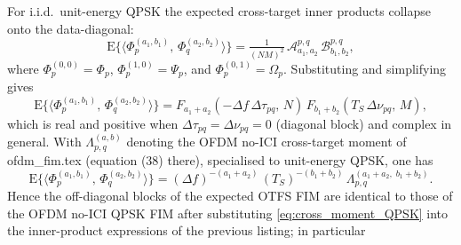 \documentclass[11pt]{article}
\begin{document}
For i.i.d.\ unit-energy QPSK the expected cross-target inner products
collapse onto the data-diagonal:
\begin{equation}
    \mathrm{E}\{\langle \Phi_p^{(a_1,b_1)},\,\Phi_q^{(a_2,b_2)}\rangle\} =
    \tfrac{1}{(NM)^2}\,\mathcal{A}_{a_1,a_2}^{p,q}\,\mathcal{B}_{b_1,b_2}^{p,q},
\end{equation}
where \(\Phi_p^{(0,0)} = \Phi_p\), \(\Phi_p^{(1,0)} = \Psi_p\), and
\(\Phi_p^{(0,1)} = \Omega_p\). Substituting and simplifying gives
\begin{equation}
    \mathrm{E}\{\langle \Phi_p^{(a_1,b_1)},\,\Phi_q^{(a_2,b_2)}\rangle\}
    = F_{a_1+a_2}\!\left(-\Delta f\,\Delta\tau_{pq},\, N\right)\,
      F_{b_1+b_2}\!\left(T_S\,\Delta\nu_{pq},\, M\right),
\label{eq:cross_moment_QPSK}
\end{equation}
which is real and positive when \(\Delta\tau_{pq} = \Delta\nu_{pq} = 0\)
(diagonal block) and complex in general. With \(\Lambda_{p,q}^{(a,b)}\)
denoting the OFDM no-ICI cross-target moment of ofdm\_fim.tex (equation
(38) there), specialised to unit-energy QPSK, one has
\begin{equation}
    \mathrm{E}\{\langle \Phi_p^{(a_1,b_1)},\,\Phi_q^{(a_2,b_2)}\rangle\}
    = (\Delta f)^{-(a_1+a_2)}\,(T_S)^{-(b_1+b_2)}\,\Lambda_{p,q}^{(a_1+a_2,\;b_1+b_2)}.
\end{equation}
Hence the off-diagonal blocks of the expected OTFS FIM are identical to
those of the OFDM no-ICI QPSK FIM after substituting
\eqref{eq:cross_moment_QPSK} into the inner-product expressions of the
previous listing; in particular
\end{document}
